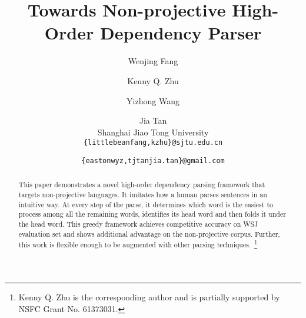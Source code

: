 \documentclass[11pt]{article}
\title{Towards Non-projective High-Order Dependency Parser}
\author{Wenjing Fang  \and Kenny Q. Zhu  \and Yizhong Wang \and Jia Tan\\
  Shanghai Jiao Tong University \\
  {\tt \{littlebeanfang,kzhu\}@sjtu.edu.cn} \and {\tt \{eastonwyz,tjtanjia.tan\}@gmail.com}\\
  }
\newcommand{\BF}[1]{\textcolor{red}{Bean: #1}}
\begin{document}
\maketitle
\begin{abstract}
This paper demonstrates a novel high-order dependency parsing framework that
targets non-projective languages.
It imitates how a human parses sentences in an intuitive way.
At every step of the parse, it determines which word is the easiest to
process among all the remaining words, identifies its head word and then
folds it under the head word.
This greedy framework achieves competitive accuracy on WSJ evaluation set
and shows additional advantage on the non-projective corpus.
Further, this work is flexible enough to be augmented with other
parsing techniques.~\footnote{Kenny Q. Zhu is the corresponding author
and is partially supported by NSFC Grant No. 61373031.}
\end{abstract}











\end{document}
